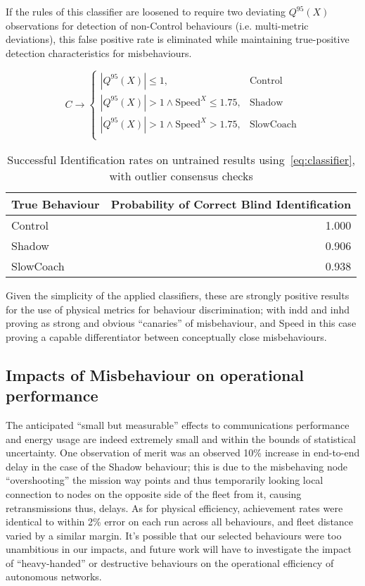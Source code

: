 If the rules of this classifier are loosened to require two deviating $Q^95(X)$ observations for detection of non-Control behaviours (i.e. multi-metric deviations), this false positive rate is eliminated while maintaining true-positive detection characteristics for misbehaviours.

\begin{equation}
C \rightarrow 
\begin{cases}
|Q^{95}(X)| \leq 1,& \text{Control}\\
|Q^{95}(X)| > 1 \land \text{Speed}^X \leq 1.75, & \text{Shadow}\\
|Q^{95}(X)| > 1 \land \text{Speed}^X > 1.75,& \text{SlowCoach}\\
\end{cases}
\label{eq:classifier_minority}
\end{equation}
\begin{table}[h]
  \caption{Successful Identification rates on untrained results using~\eqref{eq:classifier}, with outlier consensus checks}
  \centering
  \begin{tabular}{lr}
  	\toprule
  	True Behaviour &  Probability of Correct Blind Identification \\
  	\midrule
  	Control        &                                        1.000 \\
  	Shadow         &                                        0.906 \\
  	SlowCoach      &                                        0.938 \\
  	\bottomrule
  \end{tabular}
  \label{tab:classifier_minority}
\end{table}

Given the simplicity of the applied classifiers, these are strongly positive results for the use of physical metrics for behaviour discrimination; with \gls{indd} and \gls{inhd} proving as strong and obvious ``canaries'' of misbehaviour, and Speed in this case proving a capable differentiator between conceptually close misbehaviours.


\subsection{Impacts of Misbehaviour on operational performance}
The anticipated ``small but measurable'' effects to communications performance and energy usage are indeed extremely small and within the bounds of statistical uncertainty.
One observation of merit was an observed 10\% increase in end-to-end delay in the case of the Shadow behaviour; this is due to the misbehaving node ``overshooting'' the mission way points and thus temporarily looking local connection to nodes on the opposite side of the fleet from it, causing retransmissions thus, delays.
As for physical efficiency, achievement rates were identical to within 2\% error on each run across all behaviours, and fleet distance varied by a similar margin.
It's possible that our selected behaviours were too unambitious in our impacts, and future work will have to investigate the impact of ``heavy-handed'' or destructive behaviours on the operational efficiency of autonomous networks.

